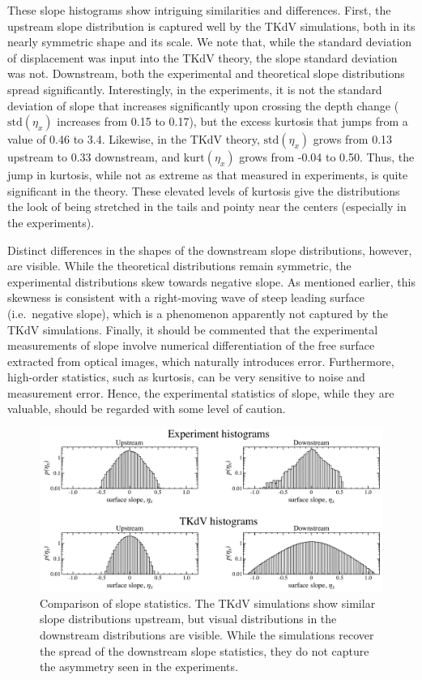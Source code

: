 \documentclass[11pt]{article}
\newcommand{\kurt}{\text{kurt}}
\newcommand{\std}{\text{std}}
\begin{document}
	These slope histograms show intriguing similarities and differences. First, the upstream slope distribution is captured well by the TKdV simulations, both in its nearly symmetric shape and its scale. We note that, while the standard deviation of displacement was input into the TKdV theory, the slope standard deviation was not. Downstream, both the experimental and theoretical slope distributions  spread significantly. Interestingly, in the experiments, it is not the standard deviation of slope that increases significantly upon crossing the depth change ($\std(\eta_x)$ increases from 0.15 to 0.17), but the excess kurtosis that jumps from a value of 0.46 to 3.4. Likewise, in the TKdV theory, $\std(\eta_x)$ grows from 0.13 upstream to 0.33 downstream, and $\kurt(\eta_x)$ grows from -0.04 to 0.50. Thus, the jump in kurtosis, while not as extreme as that measured in experiments, is quite significant in the theory. These elevated levels of kurtosis give the distributions the look of being stretched in the tails and pointy near the centers (especially in the experiments).

	Distinct differences in the shapes of the downstream slope distributions, however, are visible. While the theoretical distributions remain symmetric, the experimental distributions skew towards negative slope. As mentioned earlier, this skewness is consistent with a right-moving wave of steep leading surface (i.e.~negative slope), which is a phenomenon apparently not captured by the TKdV simulations.
Finally, it should be commented that the experimental measurements of slope involve numerical differentiation of the free surface extracted from optical images, which naturally introduces error. Furthermore, high-order statistics, such as kurtosis, can be very sensitive to noise and measurement error. Hence, the experimental statistics of slope, while they are valuable, should be regarded with some level of caution.

\begin{figure}%
\begin{center}
\includegraphics[width = 0.99 \linewidth]{Figs/slopehist.pdf}
\caption{
Comparison of slope statistics. The TKdV simulations show similar slope distributions upstream, but visual distributions in the downstream distributions are visible. While the simulations recover the spread of the downstream slope statistics, they do not capture the asymmetry seen in the experiments.
}
\label{slopehist}
\end{center}
\end{figure}
\end{document}

